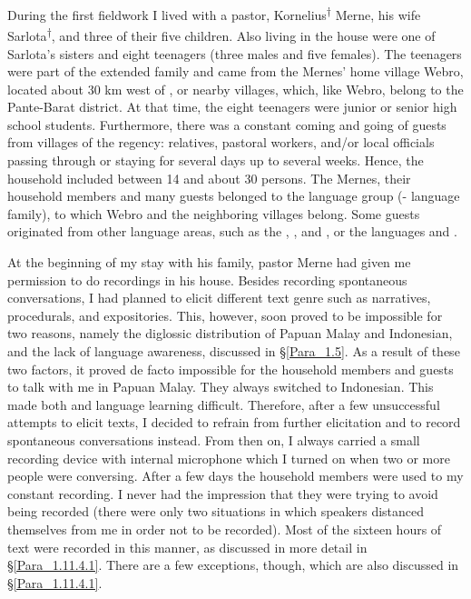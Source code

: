 {During the first fieldwork I lived with a pastor, Kornelius\textsuperscript{†} Merne, his wife Sarlota\textsuperscript{†}, and three of their five children. Also living in the house were one of Sarlota’s sisters and eight teenagers (three males and five females). The teenagers were part of the extended family and came from the Mernes’ home village Webro, located about 30 km west of , or nearby villages, which, like Webro, belong to the Pante-Barat district. At that time, the eight teenagers were junior or senior high school students. Furthermore, there was a constant coming and going of guests from villages of the  regency: relatives, pastoral workers, and/or local officials passing through or staying for several days up to several weeks. Hence, the household included between 14 and about 30 persons. The Mernes, their household members and many guests belonged to the  language group (- language family), to which Webro and the neighboring villages belong. Some guests originated from other language areas, such as the  , , and , or the  languages  and .



At the beginning of my stay with his family, pastor Merne had given me permission to do recordings in his house. Besides recording spontaneous conversations, I had planned to elicit different text genre such as narratives, procedurals, and expositories. This, however, soon proved to be impossible for two reasons, namely the diglossic distribution of Papuan Malay and Indonesian, and the lack of language awareness, discussed in §\ref{Para_1.5}. As a result of these two factors, it proved de facto impossible for the household members and guests to talk with me in Papuan Malay. They always switched to Indonesian. This made both  and language learning difficult. Therefore, after a few unsuccessful attempts to elicit texts, I decided to refrain from further elicitation and to record spontaneous conversations instead. From then on, I always carried a small recording device with internal microphone which I turned on when two or more people were conversing. After a few days the household members were used to my constant recording. I never had the impression that they were trying to avoid being recorded (there were only two situations in which speakers distanced themselves from me in order not to be recorded). Most of the sixteen hours of text were recorded in this manner, as discussed in more detail in §\ref{Para_1.11.4.1}. There are a few exceptions, though, which are also discussed in §\ref{Para_1.11.4.1}.



}
